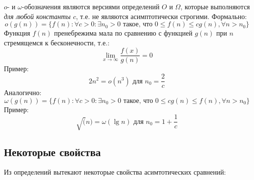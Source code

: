\documentclass[11pt]{article}
\begin{document}
$o$- и $\omega$-обозначения являются версиями определений $O$ и $\Omega$, которые выполняются 
\emph{для любой константы $c$}, т.е. не являются асимптотически строгими. Формально:
\begin{equation*}
  o(g(n)) = \{f(n): \forall c > 0: \exists n_0 > 0 \text{ такое, что }
  0 \leqslant f(n) \leqslant c g(n), \forall n > n_0
  \}
\end{equation*}
Функция $f(n)$ пренебрежима мала по сравнению с функцией $g(n)$ при $n$ стремящемся к бесконечности, т.е.: 
\begin{equation*}
  \lim_{x\to\infty}\frac{f(x)}{g(n)} = 0
\end{equation*}
Пример:
\begin{equation*}
  2n^2 = o(n^3) \text{ для } n_0 = \frac{2}{c}
\end{equation*}
Аналогично:
\begin{equation*}
  \omega(g(n)) = \{f(n): \forall c > 0: \exists n_0 > 0 \text{ такое, что }
  0 \leqslant c g(n) \leqslant f(n), \forall n > n_0
  \}
\end{equation*}
Пример:
\begin{equation*}
  \sqrt(n) = \omega(\lg n) \text{ для } n_0 = 1 + \frac{1}{c}
\end{equation*}

\subsection{Некоторые свойства}

Из определений вытекают некоторые свойства асимтотических сравнений:
\end{document}
